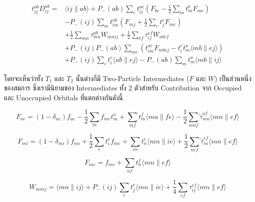 \begin{equation}
  \label{eq:doubles_cluster_operator}
  \begin{aligned}
    t_{i j}^{a b} D_{i j}^{a b}
    =
     & \langle i j \| a b\rangle+P_{-}(a b) \sum_e t_{i j}^{a e}\left(F_{b e}
    - \frac{1}{2} \sum_m t_m^b F_{m e}\right)                                                              \\
     & - P_{-}(i j) \sum_m t_{i m}^{a b}\left(F_{m j} + \frac{1}{2} \sum_e t_j^e F_{m e}\right)            \\
     & + \frac{1}{2} \sum_{m n} \tau_{m n}^{a b} W_{m n i j}
    + \frac{1}{2} \sum_{e f} \tau_{i j}^{e f} W_{a b e f}                                                  \\
     & + P_{-}(i j) P_{-}(a b) \sum_{m e}\left(t_{i m}^{a c} F_{m b e j}
    - t_i^e t_m^a\langle m b \| e j\rangle\right)                                                          \\
     & + P_{-}(i j) \sum_c t_i^e\langle a b \| e j\rangle-P_{-}(a b) \sum_m t_m^a\langle m b \| i j\rangle
  \end{aligned}
\end{equation}

\noindent โดยจะเห็นว่าทั้ง $T_{1}$ และ $T_{2}$ นั้นต่างก็มี Two-Particle Intermediates ($F$ และ $W$)
เป็นส่วนหนึ่งของสมการ ซึ่งเรามีนิยามของ Intermediates ทั้ง 2 ตัวสำหรับ Contribution จาก Occupied และ Unoccupied Orbitals
ที่แตกต่างกันดังนี้

\begin{equation}
  \label{eq:F_ae}
  F_{a e}
  = \left(1-\delta_{a e}\right) f_{a e}-\frac{1}{2} \sum_m f_{m e} t_m^a
  + \sum_{m f} t_m^f\langle m a \| f e\rangle
  - \frac{1}{2} \sum_{m n f} \tilde{\tau}_{m n}^{a f}\langle m n \| e f\rangle
\end{equation}

\begin{equation}
  \label{eq:F_mi}
  F_{m i}
  = \left(1-\delta_{m i}\right) f_{m i}+\frac{1}{2} \sum_e t_i^e f_{m e}
  + \sum_{e n} t_n^e\langle m n \| i e\rangle
  + \frac{1}{2} \sum_{n e f} \tilde{\tau}_{i n}^{e f}\langle m n \| e f\rangle
\end{equation}

\begin{equation}
  \label{eq:F_me}
  F_{m e}
  =
  f_{m e}+\sum_{n f} t_n^f\langle m n \| e f\rangle
\end{equation}

\begin{equation}
  \label{eq:W_mnij}
  W_{m n i j}
  = \langle m n \| i j\rangle+P_{-}(i j) \sum_e t_j^e\langle m n \| i e\rangle
  + \frac{1}{4} \sum_{e f} \tau_{i j}^{e f}\langle m n \| e f\rangle
\end{equation}

